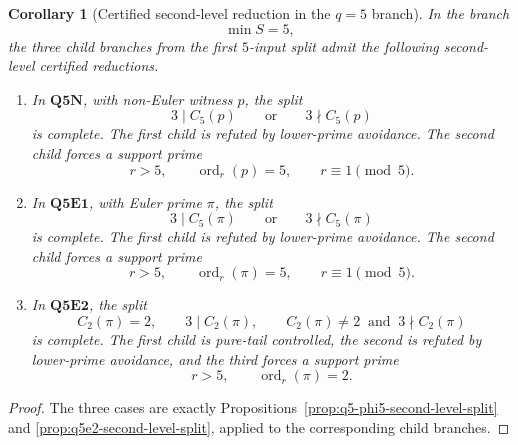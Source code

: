 \documentclass[11pt]{article}
\newtheorem{corollary}[theorem]{Corollary}
\theoremstyle{definition}
\theoremstyle{remark}
\DeclareMathOperator{\ord}{ord}
\begin{document}
\begin{corollary}[Certified second-level reduction in the \(q=5\) branch]
\label{cor:q5-second-level-forced-reduction}
In the branch
\[
  \min S=5,
\]
the three child branches from the first \(5\)-input split admit the following
second-level certified reductions.

\begin{enumerate}[label=(\roman*),leftmargin=2.2em]

\item In \(\mathbf{Q5N}\), with non-Euler witness \(p\), the split
      \[
        3\mid C_5(p)
        \qquad\text{or}\qquad
        3\nmid C_5(p)
      \]
      is complete.  The first child is refuted by lower-prime avoidance.  The
      second child forces a support prime
      \[
        r>5,
        \qquad
        \ord_r(p)=5,
        \qquad
        r\equiv1\pmod5.
      \]

\item In \(\mathbf{Q5E1}\), with Euler prime \(\pi\), the split
      \[
        3\mid C_5(\pi)
        \qquad\text{or}\qquad
        3\nmid C_5(\pi)
      \]
      is complete.  The first child is refuted by lower-prime avoidance.  The
      second child forces a support prime
      \[
        r>5,
        \qquad
        \ord_r(\pi)=5,
        \qquad
        r\equiv1\pmod5.
      \]

\item In \(\mathbf{Q5E2}\), the split
      \[
        C_2(\pi)=2,
        \qquad
        3\mid C_2(\pi),
        \qquad
        C_2(\pi)\ne2\ \text{ and }\ 3\nmid C_2(\pi)
      \]
      is complete.  The first child is pure-tail controlled, the second is
      refuted by lower-prime avoidance, and the third forces a support prime
      \[
        r>5,
        \qquad
        \ord_r(\pi)=2.
      \]
\end{enumerate}
\end{corollary}

\begin{proof}
The three cases are exactly Propositions~\ref{prop:q5-phi5-second-level-split}
and \ref{prop:q5e2-second-level-split}, applied to the corresponding child
branches.
\end{proof}
\end{document}
